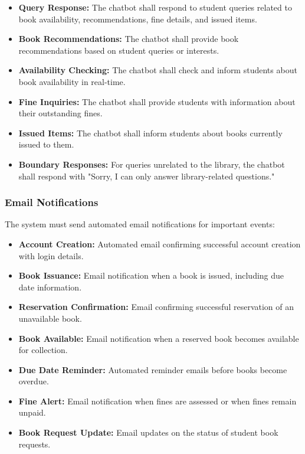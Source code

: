\documentclass[12pt,a4paper]{report}
\begin{document}
\begin{itemize}
    \item \textbf{Query Response:} The chatbot shall respond to student queries related to book availability, recommendations, fine details, and issued items.
    
    \item \textbf{Book Recommendations:} The chatbot shall provide book recommendations based on student queries or interests.
    
    \item \textbf{Availability Checking:} The chatbot shall check and inform students about book availability in real-time.
    
    \item \textbf{Fine Inquiries:} The chatbot shall provide students with information about their outstanding fines.
    
    \item \textbf{Issued Items:} The chatbot shall inform students about books currently issued to them.
    
\newpage    
    
    \item \textbf{Boundary Responses:} For queries unrelated to the library, the chatbot shall respond with "Sorry, I can only answer library-related questions."
\end{itemize}

\subsubsection{Email Notifications}

The system must send automated email notifications for important events:

\begin{itemize}
    \item \textbf{Account Creation:} Automated email confirming successful account creation with login details.
    
    \item \textbf{Book Issuance:} Email notification when a book is issued, including due date information.
    
    \item \textbf{Reservation Confirmation:} Email confirming successful reservation of an unavailable book.
    
    \item \textbf{Book Available:} Email notification when a reserved book becomes available for collection.
    
    \item \textbf{Due Date Reminder:} Automated reminder emails before books become overdue.
    
    \item \textbf{Fine Alert:} Email notification when fines are assessed or when fines remain unpaid.
    
    \item \textbf{Book Request Update:} Email updates on the status of student book requests.
\end{itemize}
\end{document}
